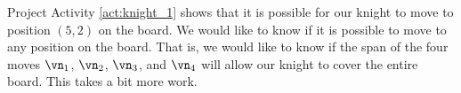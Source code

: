 \begin{pactivity}
\begin{comment}
The system from part (a) is equivalent to 
\[x_1 \vn_1 + x_2 \vn_2 + x_3 \vn_3 + x_4 \vn_4 = \left[ \begin{array}{c} 4\\2 \end{array} \right].\]
We solve this system by row reducing the augmented matrix
\[\left[ \begin{array}{crcr|c} 1&-1&2&-2&4 \\ 2&2&1&1&2 \end{array} \right].\]
The reduced row echelon form of this matrix is 
\[\left[ \renewcommand{\arraystretch}{1.4} \begin{array}{ccrr|r} 1&0&\frac{5}{4}&-\frac{3}{4}&\frac{5}{2} \\ 0&1&-\frac{3}{4}&\frac{5}{4}&-\frac{3}{2} \end{array} \right].\]
This makes $x_3$ and $x_4 arbitrary, and 
\begin{align*}
x_1 &= -\frac{5}{4}x_3 + \frac{3}{4}x_4 + \frac{5}{2} = \frac{1}{4}\left( -5x_3 + 3x_4 + 10\right) \\
x_2 &= \frac{3}{4}x_3 - \frac{5}{4}x_4 - \frac{3}{2} = \frac{1}{4}\left( 3x_3 - 5x_4 - 6\right).
\end{align*}
In order to have integer values of $x_1$ and $x_2$, we must choose $x_3$ and $x_4$ carefully. If we let $x_3 = x_4 = 1$, then $x_1 = 2$ and $x_2 = -2$. So we can make move $\vn_1$ twice, move $-\vn_2$ twice, and moves $\vn_3$ and $\vn_4$ once each. 

This is not the only possibility. If we let $x_4 = 2$ and $x_3 = 0$, then $x_1 = 4$ and $x_2 = -4$. 

\end{comment}

	\ea
	
\end{pactivity}

Project Activity \ref{act:knight_1} shows that it is possible for our knight to move to position $(5,2)$ on the board. We would like to know if it is possible to move to any position on the board. That is, we would like to know if the span of the four moves $\vn_1$, $\vn_2$, $\vn_3$, and $\vn_4$ will allow our knight to cover the entire board. This takes a bit more work. 

